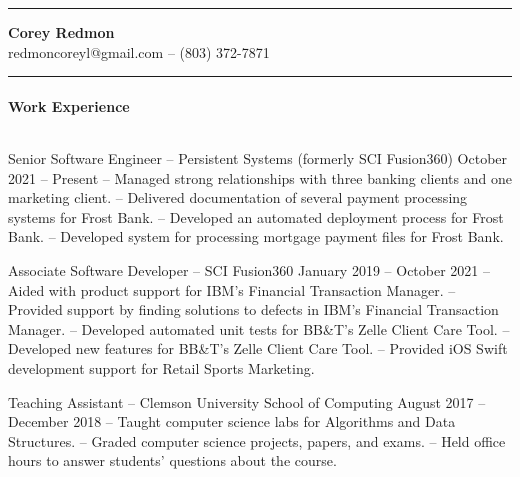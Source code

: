 \documentclass{article}
\begin{document}
	\hrule height 1pt
	\begin{center}
		{\Large \textbf{Corey Redmon}}\\
		redmoncoreyl@gmail.com -- (803) 372-7871
	\end{center}
	\vspace{0.1in}
	\hrule height 1pt

	\setlength{\parskip}{0.0in}
	\setlength{\parindent}{0.4in}

	\paragraph{Work Experience} $ $

	\hangindent=0.8in
	Senior Software Engineer -- Persistent Systems (formerly SCI Fusion360) \hfill October 2021 -- Present \newline
	-- Managed strong relationships with three banking clients and one marketing client. \newline
	-- Delivered documentation of several payment processing systems for Frost Bank. \newline
	-- Developed an automated deployment process for Frost Bank. \newline
	-- Developed system for processing mortgage payment files for Frost Bank.

	\hangindent=0.8in
	Associate Software Developer -- SCI Fusion360 \hfill January 2019 -- October 2021 \newline
	-- Aided with product support for IBM's Financial Transaction Manager. \newline
	-- Provided support by finding solutions to defects in IBM's Financial Transaction Manager. \newline
	-- Developed automated unit tests for BB\&T's Zelle Client Care Tool. \newline
	-- Developed new features for BB\&T's Zelle Client Care Tool. \newline
	-- Provided iOS Swift development support for Retail Sports Marketing.

	\hangindent=0.8in
	Teaching Assistant -- Clemson University School of Computing \hfill August 2017 -- December 2018 \newline
	-- Taught computer science labs for Algorithms and Data Structures. \newline
	-- Graded computer science projects, papers, and exams. \newline
	-- Held office hours to answer students' questions about the course.
\end{document}
